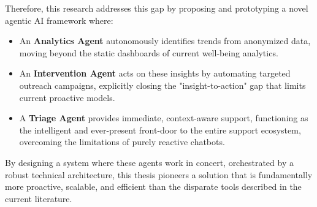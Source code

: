 Therefore, this research addresses this gap by proposing and prototyping a novel agentic AI framework where:
\begin{itemize}
    \item An \textbf{Analytics Agent} autonomously identifies trends from anonymized data, moving beyond the static dashboards of current well-being analytics.
    \item An \textbf{Intervention Agent} acts on these insights by automating targeted outreach campaigns, explicitly closing the "insight-to-action" gap that limits current proactive models.
    \item A \textbf{Triage Agent} provides immediate, context-aware support, functioning as the intelligent and ever-present front-door to the entire support ecosystem, overcoming the limitations of purely reactive chatbots.
\end{itemize}
By designing a system where these agents work in concert, orchestrated by a robust technical architecture, this thesis pioneers a solution that is fundamentally more proactive, scalable, and efficient than the disparate tools described in the current literature.